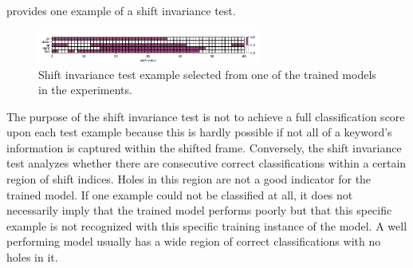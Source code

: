  provides one example of a shift invariance test.
\begin{figure}[!ht]
  \centering
    \includegraphics[width=0.65\textwidth]{./5_exp/figs/exp_fs_cepstral_tb_shift_conv-jim_mfcc12_norm0.png}
  \caption{Shift invariance test example selected from one of the trained models in the experiments.}
  \label{fig:exp_details_tb_shift}
\end{figure}
\FloatBarrier
\noindent
The purpose of the shift invariance test is not to achieve a full classification score upon each test example because this is hardly possible if not all of a keyword's information is captured within the shifted frame.
Conversely, the shift invariance test analyzes whether there are consecutive correct classifications within a certain region of shift indices.
Holes in this region are not a good indicator for the trained model.
If one example could not be classified at all, it does not necessarily imply that the trained model performs poorly but that this specific example is not recognized with this specific training instance of the model.
A well performing model usually has a wide region of correct classifications with no holes in it.



